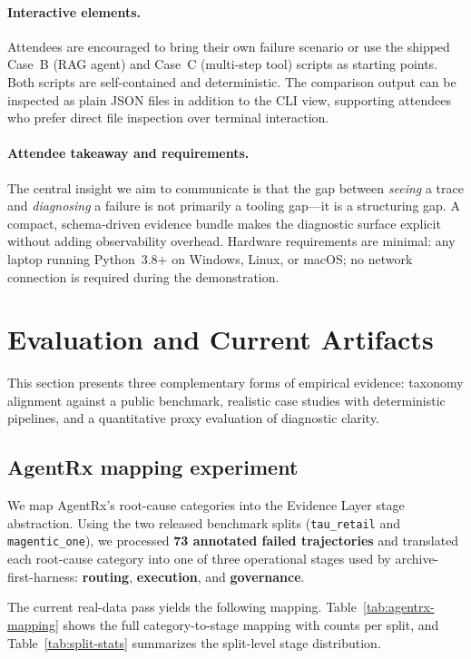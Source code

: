 \documentclass[11pt]{article}
\begin{document}
\paragraph{Interactive elements.}
Attendees are encouraged to bring their own failure scenario or use the shipped Case~B (RAG agent) and Case~C (multi-step tool) scripts as starting points. Both scripts are self-contained and deterministic. The comparison output can be inspected as plain JSON files in addition to the CLI view, supporting attendees who prefer direct file inspection over terminal interaction.

\paragraph{Attendee takeaway and requirements.}
The central insight we aim to communicate is that the gap between \emph{seeing} a trace and \emph{diagnosing} a failure is not primarily a tooling gap---it is a structuring gap. A compact, schema-driven evidence bundle makes the diagnostic surface explicit without adding observability overhead. Hardware requirements are minimal: any laptop running Python~3.8+ on Windows, Linux, or macOS; no network connection is required during the demonstration.

\section{Evaluation and Current Artifacts}
\label{sec:eval}

This section presents three complementary forms of empirical evidence: taxonomy alignment against a public benchmark, realistic case studies with deterministic pipelines, and a quantitative proxy evaluation of diagnostic clarity.

\subsection{AgentRx mapping experiment}

We map AgentRx's root-cause categories into the Evidence Layer stage abstraction. Using the two released benchmark splits (\texttt{tau\_retail} and \texttt{magentic\_one}), we processed \textbf{73 annotated failed trajectories} and translated each root-cause category into one of three operational stages used by archive-first-harness: \textbf{routing}, \textbf{execution}, and \textbf{governance}.

The current real-data pass yields the following mapping. Table~\ref{tab:agentrx-mapping} shows the full category-to-stage mapping with counts per split, and Table~\ref{tab:split-stats} summarizes the split-level stage distribution.
\end{document}
